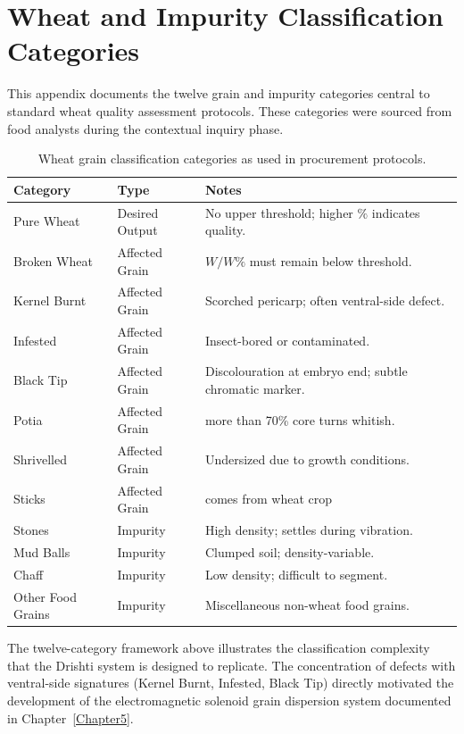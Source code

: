 
\chapter{Wheat and Impurity Classification Categories}

\label{AppendixA}


This appendix documents the twelve grain and impurity categories central to standard wheat quality assessment protocols. These categories were sourced from food analysts during the contextual inquiry phase.

\vspace{1em}

\begin{table}[h!]
\centering
\caption{Wheat grain classification categories as used in procurement protocols.}
\label{tab:thresholds}
\begin{tabular}{llp{5cm}}
\toprule
\textbf{Category} & \textbf{Type} & \textbf{Notes} \\
\midrule
Pure Wheat          & Desired Output    & No upper threshold; higher $\%$ indicates quality. \\
Broken Wheat        & Affected Grain    & $W/W\%$ must remain below threshold. \\
Kernel Burnt        & Affected Grain    & Scorched pericarp; often ventral-side defect. \\
Infested            & Affected Grain    & Insect-bored or contaminated. \\
Black Tip           & Affected Grain    & Discolouration at embryo end; subtle chromatic marker. \\
Potia               & Affected Grain    & more than 70\% core turns whitish. \\
Shrivelled            & Affected Grain    & Undersized due to growth conditions. \\
Sticks            & Affected Grain    & comes from wheat crop \\
Stones               & Impurity          & High density; settles during vibration. \\
Mud Balls         & Impurity          & Clumped soil; density-variable. \\
Chaff               & Impurity          & Low density; difficult to segment. \\
Other Food Grains    & Impurity          & Miscellaneous non-wheat food grains. \\
\bottomrule
\end{tabular}
\end{table}

\vspace{1em}

The twelve-category framework above illustrates the classification complexity that the Drishti system is designed to replicate. The concentration of defects with ventral-side signatures (Kernel Burnt, Infested, Black Tip) directly motivated the development of the electromagnetic solenoid grain dispersion system documented in Chapter~\ref{Chapter5}.
